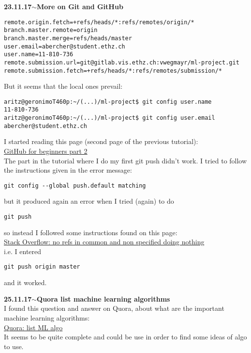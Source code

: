 \documentclass[11pt,a4paper]{article}
\newenvironment{loggentry}[2]%
{\noindent\textbf{#1}\hspace{1cm}$\mathbf{\sim}$\text{ }\textbf{#2}\\}{\vspace{0.5cm}}
\begin{document}
\begin{loggentry}{23.11.17}{More on Git and GitHub}
\begin{verbatim}
remote.origin.fetch=+refs/heads/*:refs/remotes/origin/*
branch.master.remote=origin
branch.master.merge=refs/heads/master
user.email=abercher@student.ethz.ch
user.name=11-810-736
remote.submission.url=git@gitlab.vis.ethz.ch:vwegmayr/ml-project.git
remote.submission.fetch=+refs/heads/*:refs/remotes/submission/*
\end{verbatim}
But it seems that the local ones prevail:
\begin{verbatim}
aritz@geronimoT460p:~/(...)/ml-project$ git config user.name
11-810-736
aritz@geronimoT460p:~/(...)/ml-project$ git config user.email
abercher@student.ethz.ch
\end{verbatim}
I started reading this page (second page of the previous tutorial):\\
\href{https://readwrite.com/2013/10/02/github-for-beginners-part-2/}{GitHub for beginners part 2}\\
The part in the tutorial where I do my first git push didn't work. I  tried to follow the instructions given in the error message:\\
\begin{verbatim}
git config --global push.default matching
\end{verbatim}
but it produced again an error when I tried (again) to do 
\begin{verbatim}
git push
\end{verbatim}
so instead I followed some instructions found on this page:\\
\href{https://stackoverflow.com/questions/23528761/no-refs-in-common-and-none-specified-doing-nothing#25062493}{Stack Overflow: no refs in common and non specified doing nothing}\\
i.e. I entered\\
\begin{verbatim}
git push origin master
\end{verbatim}
and it worked.
\end{loggentry}

\begin{loggentry}{25.11.17}{Quora list machine learning algorithms}
I found this question and answer on Quora, about what are the important machine learning algorithms:\\
\href{https://www.quora.com/What-are-some-machine-learning-algorithms-that-you-should-always-have-a-strong-understanding-of-and-why}{Quora: list ML algo}\\
It seems to be quite complete and could be use in order to find some ideas of algo to use.
\end{loggentry}
\end{document}
